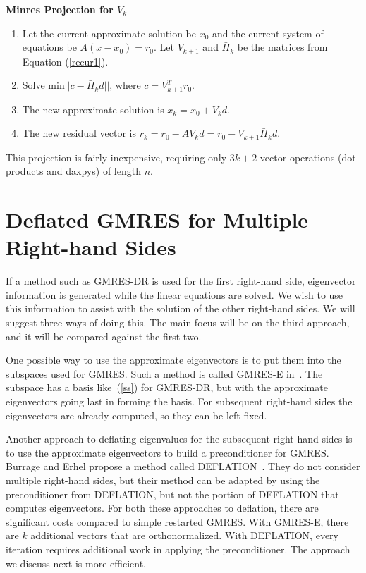 \documentclass[final]{siamltex}
\begin{document}
\vspace{.10in}
\begin{center}
\textbf{Minres Projection for $V_k$}
\end{center}
\begin{enumerate}
 \item Let the current approximate solution be $x_0$ and the current system
of equations be $A(x-x_0) = r_0$.  Let $V_{k+1}$ and $\bar H_k$ be the matrices from Equation (\ref{recur1}).  
 \item Solve min$||c - \bar H_k d||$, where $c = V_{k+1}^T r_0$.
 \item The new approximate solution is $x_k = x_0 + V_{k}d$.
 \item The new residual vector is $r_k = r_0 - AV_{k} d = r_0 - V_{k+1} \bar H_k d$.
\end{enumerate} 
\vspace{.15in}

This projection is fairly inexpensive, requiring only $3k+2$ vector operations (dot products and daxpys) of length $n$.  

\section{Deflated GMRES for Multiple Right-hand Sides}

If a method such as GMRES-DR is used for the first right-hand side, eigenvector information is generated while the linear equations are solved.  We wish to use this information to assist with the solution of the other right-hand sides.  We will suggest three ways of doing this.  The main focus will be on the third approach, and it will be compared against the first two.

One possible way to use the approximate eigenvectors is to put them into the subspaces used for GMRES.  Such a method is called GMRES-E in~\cite{GMRES-E}.  The subspace has a basis like~(\ref{ss}) for GMRES-DR, but with the approximate eigenvectors going last in forming the basis. For subsequent right-hand sides the eigenvectors are already computed, so they can be left fixed.  

Another approach to deflating eigenvalues for the subsequent right-hand sides is to use the approximate eigenvectors to build a preconditioner for GMRES.  Burrage and Erhel propose a method called DEFLATION~\cite{BuEr}.  They do not consider multiple right-hand sides, but their method can be adapted by using the preconditioner from DEFLATION, but not the portion of DEFLATION that computes eigenvectors.  For both these approaches to deflation, there are significant costs compared to simple restarted GMRES.  With GMRES-E, there are $k$ additional vectors that are orthonormalized.  With DEFLATION, every iteration requires additional work in applying the preconditioner.  The approach we discuss next is more efficient. 
\end{document}

